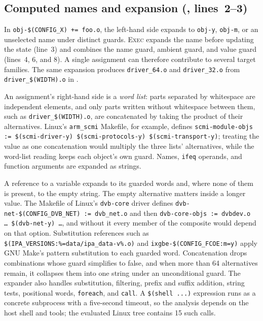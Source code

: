 \documentclass[acmsmall,screen,review]{acmart}
\begin{document}
\subsection{Computed names and expansion (, lines~2--3)}
\label{sec:design:expand}
In \texttt{obj-\$(CONFIG\_X) += foo.o}, the left-hand side expands to \texttt{obj-y}, \texttt{obj-m}, or an unselected name under distinct guards. \textsc{Exec} expands the name before updating the state (line~3) and combines the name guard, ambient guard, and value guard (lines~4, 6, and 8). A single assignment can therefore contribute to several target families. The same expansion produces \texttt{driver\_64.o} and \texttt{driver\_32.o} from \texttt{driver\_\$(WIDTH).o} in .

An assignment's right-hand side is a \emph{word list}: parts separated by whitespace are independent elements, and only parts written without whitespace between them, such as \texttt{driver\_\$(WIDTH).o}, are concatenated by taking the product of their alternatives. Linux's \texttt{arm\_scmi} Makefile, for example, defines \texttt{scmi-module-objs := \$(scmi-driver-y) \$(scmi-protocols-y) \$(scmi-transport-y)}; treating the value as one concatenation would multiply the three lists' alternatives, while the word-list reading keeps each object's own guard. Names, \texttt{ifeq} operands, and function arguments are expanded as strings.

A reference to a variable expands to its guarded words and, where none of them is present, to the empty string. The empty alternative matters inside a longer value. The Makefile of Linux's \texttt{dvb-core} driver defines \texttt{dvb-net-\$(CONFIG\_DVB\_NET) := dvb\_net.o} and then \texttt{dvb-core-objs := dvbdev.o \ldots\ \$(dvb-net-y) \ldots}, and without it every member of the composite would depend on that option. Substitution references such as \texttt{\$(IPA\_VERSIONS:\%=data/ipa\_data-v\%.o)} and \texttt{ixgbe-\$(CONFIG\_FCOE:m=y)} apply GNU Make's pattern substitution to each guarded word. Concatenation drops combinations whose guard simplifies to false, and when more than 64 alternatives remain, it collapses them into one string under an unconditional guard. The expander also handles substitution, filtering, prefix and suffix addition, string tests, positional words, \texttt{foreach}, and \texttt{call}. A \texttt{\$(shell ...)} expression runs as a concrete subprocess with a five-second timeout, so the analysis depends on the host shell and tools; the evaluated Linux tree contains 15 such calls.
\end{document}
